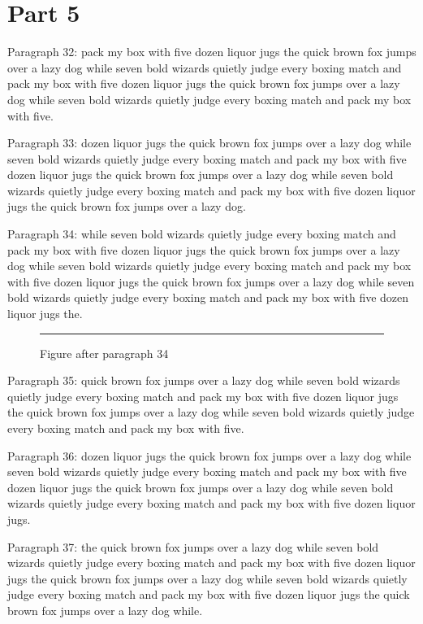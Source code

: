 \documentclass[twocolumn]{article}
\begin{document}
\section{Part 5}
Paragraph 32: pack my box with five dozen liquor jugs the quick brown fox jumps over a lazy dog while seven bold wizards quietly judge every boxing match and pack my box with five dozen liquor jugs the quick brown fox jumps over a lazy dog while seven bold wizards quietly judge every boxing match and pack my box with five.

Paragraph 33: dozen liquor jugs the quick brown fox jumps over a lazy dog while seven bold wizards quietly judge every boxing match and pack my box with five dozen liquor jugs the quick brown fox jumps over a lazy dog while seven bold wizards quietly judge every boxing match and pack my box with five dozen liquor jugs the quick brown fox jumps over a lazy dog.

Paragraph 34: while seven bold wizards quietly judge every boxing match and pack my box with five dozen liquor jugs the quick brown fox jumps over a lazy dog while seven bold wizards quietly judge every boxing match and pack my box with five dozen liquor jugs the quick brown fox jumps over a lazy dog while seven bold wizards quietly judge every boxing match and pack my box with five dozen liquor jugs the.

\begin{figure}[htbp]\centering\rule{0.8\columnwidth}{5em}\caption{Figure after paragraph 34}\end{figure}
Paragraph 35: quick brown fox jumps over a lazy dog while seven bold wizards quietly judge every boxing match and pack my box with five dozen liquor jugs the quick brown fox jumps over a lazy dog while seven bold wizards quietly judge every boxing match and pack my box with five.

Paragraph 36: dozen liquor jugs the quick brown fox jumps over a lazy dog while seven bold wizards quietly judge every boxing match and pack my box with five dozen liquor jugs the quick brown fox jumps over a lazy dog while seven bold wizards quietly judge every boxing match and pack my box with five dozen liquor jugs.

Paragraph 37: the quick brown fox jumps over a lazy dog while seven bold wizards quietly judge every boxing match and pack my box with five dozen liquor jugs the quick brown fox jumps over a lazy dog while seven bold wizards quietly judge every boxing match and pack my box with five dozen liquor jugs the quick brown fox jumps over a lazy dog while.
\end{document}
